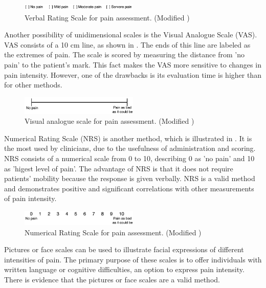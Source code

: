 \begin{figure}[H]
	\includegraphics[width=0.5\textwidth]{figures/VRS.png} 
	\caption{Verbal Rating Scale for pain assessment. (Modified \cite{Jensen2001})}
	\label{fig:VRS}  
\end{figure}   

Another possibility of unidimensional scales is the Visual Analogue Scale (VAS). VAS consists of a 10 cm line, as shown in . The ends of this line are labeled as the extremes of pain. The scale is scored by measuring the distance from 'no pain' to the patient's mark. This fact makes the VAS more sensitive to changes in pain intensity. However, one of the drawbacks is its evaluation time is higher than for other methods.~\cite{Jensen2001} 

\begin{figure}[H]
	\includegraphics[width=0.5\textwidth]{figures/VAS.png} 
	\caption{Visual analogue scale for pain assessment. (Modified \cite{Jensen2001})}
	\label{fig:VAS}  
\end{figure}   

Numerical Rating Scale (NRS) is another method, which is illustrated in . It is the most used by clinicians, due to the usefulness of administration and scoring. \cite{Fillingim2016} NRS consists of a numerical scale from 0 to 10, describing 0 as 'no pain' and  10 as 'higest level of pain'. The advantage of NRS is that it does not require patients' mobility because the response is given verbally. NRS is a valid method and demonstrates positive and significant correlations with other measurements of pain intensity. \cite{Jensen2001} 

\begin{figure}[H]
	\includegraphics[width=0.5\textwidth]{figures/NRS.png} 
	\caption{Numerical Rating Scale for pain assessment. (Modified \cite{Jensen2001})}
	\label{fig:NRS}  
\end{figure}   

Pictures or face scales can be used to illustrate facial expressions of different intensities of pain. The primary purpose of these scales is to offer individuals with written language or cognitive difficulties, an option to express pain intensity. There is evidence that the pictures or face scales are a valid method. \cite{Jensen2001} 

